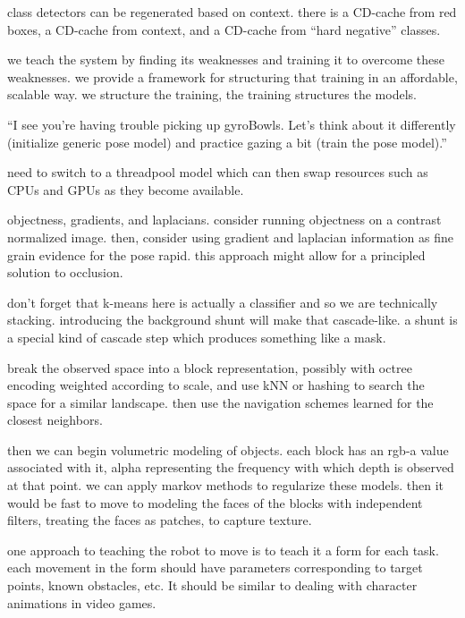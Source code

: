 \documentclass[12pt]{article}
\numberwithin{equation}{section}
\numberwithin{table}{section}
\numberwithin{figure}{section}
\begin{document}
class detectors can be regenerated based on context. there is a CD-cache from red boxes, a CD-cache from context, and a CD-cache from “hard negative” classes.

we teach the system by finding its weaknesses and training it to overcome these weaknesses. we provide a framework for structuring that training in an affordable, scalable way.  we structure the training, the training structures the models.

“I see you’re having trouble picking up gyroBowls. Let’s think about it differently (initialize generic pose model) and practice gazing a bit (train the pose model).”

need to switch to a threadpool model which can then swap resources such as CPUs and GPUs as they become available.

objectness, gradients, and laplacians. consider running objectness on a contrast normalized image. then, consider using gradient and laplacian information as fine grain evidence for the pose rapid. this approach might allow for a principled solution to occlusion.

don’t forget that k-means here is actually a classifier and so we are technically stacking. introducing the background shunt will make that cascade-like. a shunt is a special kind of cascade step which produces something like a mask.

break the observed space into a block representation, possibly with octree encoding weighted according to scale, and use kNN or hashing to search the space for a similar landscape. then use the navigation schemes learned for the closest neighbors. 

then we can begin volumetric modeling of objects. each block has an rgb-a value associated with it, alpha representing the frequency with which depth is observed at that point.
we can apply markov methods to regularize these models. then it would be fast to move to modeling the faces of the blocks with independent filters, treating the faces as patches, to capture texture.

one approach to teaching the robot to move is to teach it a form for each task. each movement in the form should have parameters corresponding to target points, known obstacles, etc.  It should be similar to dealing with character animations in video games. 




\newpage



\end{document}
